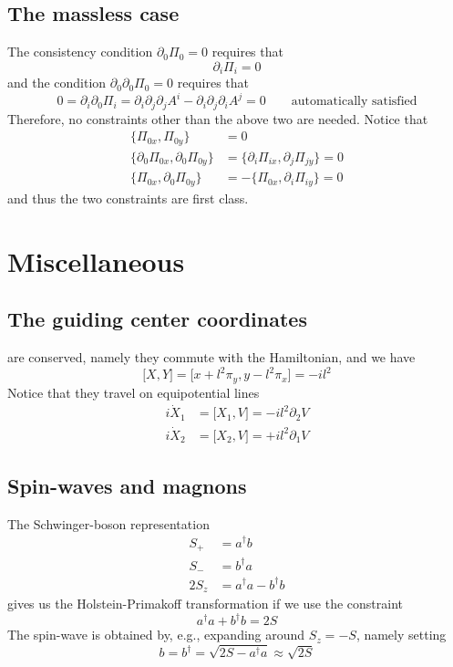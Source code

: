 \documentclass[12pt, oneside]{book}
\begin{document}
\section*{The massless case}
The consistency condition $\partial_0\Pi_0=0$ requires that
\[
\partial_i\Pi_i=0
\]
and the condition $\partial_0\partial_0\Pi_0=0$ requires that
\[
0=\partial_i\partial_0\Pi_i=\partial_i\partial_j\partial_jA^i-\partial_i\partial_j\partial_iA^j=0\qquad
\text{automatically satisfied}
\]
Therefore, no constraints other than the above two are needed. Notice that
\begin{align*}
\big\{\Pi_{0x},\Pi_{0y}\big\}&=0\\
\big\{\partial_0\Pi_{0x},\partial_0\Pi_{0y}\big\}&=\big\{\partial_i\Pi_{ix},\partial_j\Pi_{jy}\big\}=0\\
\big\{\Pi_{0x},\partial_0\Pi_{0y}\big\}&=-\big\{\Pi_{0x},\partial_i\Pi_{iy}\big\}=0
\end{align*}
and thus the two constraints are first class.

\chapter{Miscellaneous}
\section*{The guiding center coordinates}
are conserved, namely they commute with the Hamiltonian, and we have
\[
\big[X,Y\big]=\big[x+l^2\pi_y,y-l^2\pi_x\big]=-il^2
\]
Notice that they travel on equipotential lines
\begin{align*}
i\dot{X}_1&=\big[X_1,V\big]=-il^2\partial_2V\\
i\dot{X}_2&=\big[X_2,V\big]=+il^2\partial_1V
\end{align*}

\section*{Spin-waves and magnons}
The Schwinger-boson representation
\begin{align*}
S_+&=a^{\dagger}b\\
S_-&=b^{\dagger}a\\
2S_z&=a^{\dagger}a-b^{\dagger}b
\end{align*}
gives us the Holstein-Primakoff transformation if we use the constraint
\[
a^{\dagger}a+b^{\dagger}b=2S
\]
The spin-wave is obtained by, e.g., expanding around $S_z=-S$, namely setting
\[
b=b^{\dagger}=\sqrt{2S-a^{\dagger}a}\approx\sqrt{2S}
\]
\end{document}
